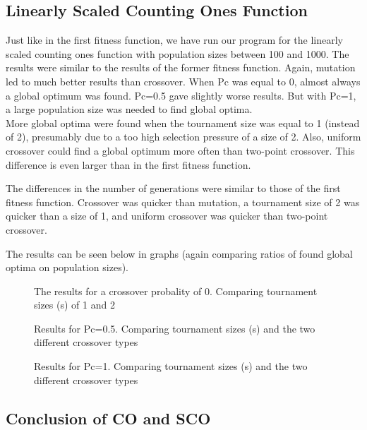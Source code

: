 \documentclass[10pt,a4paper,onecolumn]{article}
\begin{document}
\subsection{Linearly Scaled Counting Ones Function}

Just like in the first fitness function, we have run our program for the linearly scaled counting ones function with population sizes between 100 and 1000.
The results were similar to the results of the former fitness function.
Again, mutation led to much better results than crossover.
When Pc was equal to 0, almost always a global optimum was found. Pc=0.5 gave slightly worse results.
But with Pc=1, a large population size was needed to find global optima.\\

More global optima were found when the tournament size was equal to 1 (instead of 2), presumably due to a too high selection pressure of a size of 2. Also, uniform crossover could find a global optimum more often than two-point crossover.
This difference is even larger than in the first fitness function.

The differences in the number of generations were similar to those of the first fitness function.
Crossover was quicker than mutation, a tournament size of 2 was quicker than a size of 1, and uniform crossover was quicker than two-point crossover.

The results can be seen below in graphs (again comparing ratios of found global optima on population sizes).

\begin{figure}
    \centering
    \caption{The results for a crossover probality of 0. Comparing tournament sizes (s) of 1 and 2}
\end{figure}

\begin{figure}
    \centering
    \caption{Results for Pc=0.5. Comparing tournament sizes (s) and the two different crossover types}
\end{figure}

\begin{figure}
    \centering
    \caption{Results for Pc=1. Comparing tournament sizes (s) and the two different crossover types}
\end{figure}

\subsection{Conclusion of CO and SCO}
\end{document}
